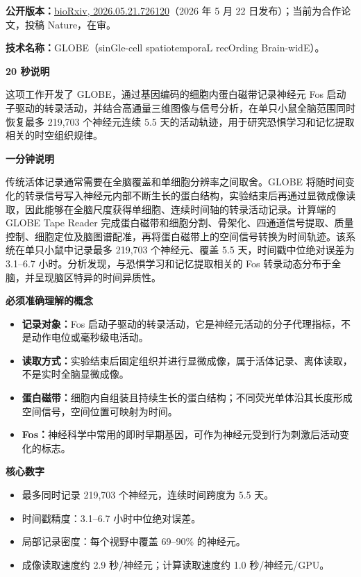 \documentclass[11pt,a4paper]{ctexart}
\newcommand{\prompt}[1]{\textbf{\color{accent}#1}}
\begin{document}
\textbf{公开版本：}\href{https://doi.org/10.64898/2026.05.21.726120}{bioRxiv, 2026.05.21.726120}（2026 年 5 月 22 日发布）；当前为合作论文，投稿 Nature，在审。

\textbf{技术名称：}GLOBE（sinGle-cell spatiotemporaL recOrding Brain-widE）。

\prompt{20 秒说明}

这项工作开发了 GLOBE，通过基因编码的细胞内蛋白磁带记录神经元 Fos 启动子驱动的转录活动，并结合高通量三维图像与信号分析，在单只小鼠全脑范围同时恢复最多 219,703 个神经元连续 5.5 天的活动轨迹，用于研究恐惧学习和记忆提取相关的时空组织规律。

\prompt{一分钟说明}

传统活体记录通常需要在全脑覆盖和单细胞分辨率之间取舍。GLOBE 将随时间变化的转录信号写入神经元内部不断生长的蛋白结构，实验结束后再通过显微成像读取，因此能够在全脑尺度获得单细胞、连续时间轴的转录活动记录。计算端的 GLOBE Tape Reader 完成蛋白磁带和细胞分割、骨架化、四通道信号提取、质量控制、细胞定位及脑图谱配准，再将蛋白磁带上的空间信号转换为时间轨迹。该系统在单只小鼠中记录最多 219,703 个神经元、覆盖 5.5 天，时间戳中位绝对误差为 3.1--6.7 小时。分析发现，与恐惧学习和记忆提取相关的 Fos 转录动态分布于全脑，并呈现脑区特异的时间异质性。

\prompt{必须准确理解的概念}
\begin{itemize}
  \item \textbf{记录对象：}Fos 启动子驱动的转录活动，它是神经元活动的分子代理指标，不是动作电位或毫秒级电活动。
  \item \textbf{读取方式：}实验结束后固定组织并进行显微成像，属于活体记录、离体读取，不是实时全脑显微成像。
  \item \textbf{蛋白磁带：}细胞内自组装且持续生长的蛋白结构；不同荧光单体沿其长度形成空间信号，空间位置可映射为时间。
  \item \textbf{Fos：}神经科学中常用的即时早期基因，可作为神经元受到行为刺激后活动变化的标志。
\end{itemize}

\prompt{核心数字}
\begin{itemize}
  \item 最多同时记录 219,703 个神经元，连续时间跨度为 5.5 天。
  \item 时间戳精度：3.1--6.7 小时中位绝对误差。
  \item 局部记录密度：每个视野中覆盖 69--90\% 的神经元。
  \item 成像读取速度约 2.9 秒/神经元；计算读取速度约 1.0 秒/神经元/GPU。
\end{itemize}
\end{document}
